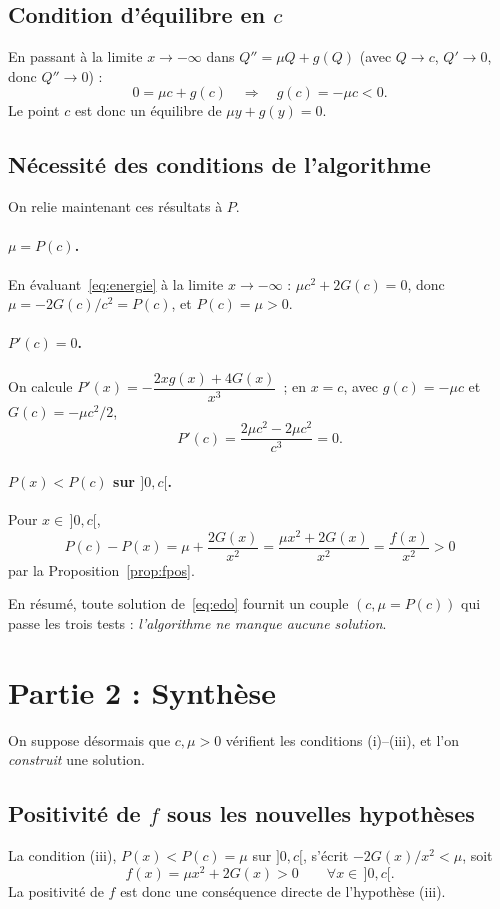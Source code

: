 \documentclass[11pt,a4paper]{article}
\theoremstyle{plain}
\theoremstyle{remark}
\begin{document}
\subsection{Condition d'équilibre en $c$}
En passant à la limite $x\to-\infty$ dans $Q''=\mu Q+g(Q)$ (avec $Q\to c$,
$Q'\to0$, donc $Q''\to0$) :
\[
  0=\mu c+g(c)\quad\Longrightarrow\quad g(c)=-\mu c<0.
\]
Le point $c$ est donc un équilibre de $\mu y+g(y)=0$.

\subsection{Nécessité des conditions de l'algorithme}
On relie maintenant ces résultats à $P$.
\paragraph{$\mu=P(c)$.} En évaluant~\eqref{eq:energie} à la limite $x\to-\infty$ :
$\mu c^2+2G(c)=0$, donc $\mu=-2G(c)/c^2=P(c)$, et $P(c)=\mu>0$.
\paragraph{$P'(c)=0$.} On calcule $P'(x)=-\dfrac{2xg(x)+4G(x)}{x^3}$\ ;
en $x=c$, avec $g(c)=-\mu c$ et $G(c)=-\mu c^2/2$,
\[
  P'(c)=\frac{2\mu c^2-2\mu c^2}{c^3}=0.
\]
\paragraph{$P(x)<P(c)$ sur $]0,c[$.} Pour $x\in\,]0,c[$,
\[
  P(c)-P(x)=\mu+\frac{2G(x)}{x^2}=\frac{\mu x^2+2G(x)}{x^2}=\frac{f(x)}{x^2}>0
\]
par la Proposition~\ref{prop:fpos}. \medskip

\noindent En résumé, toute solution de~\eqref{eq:edo} fournit un couple
$(c,\mu=P(c))$ qui passe les trois tests : \emph{l'algorithme ne manque aucune
solution}.

\section{Partie 2 : Synthèse}
\label{sec:synthese}

On suppose désormais que $c,\mu>0$ vérifient les conditions (i)--(iii), et l'on
\emph{construit} une solution.

\subsection{Positivité de $f$ sous les nouvelles hypothèses}
La condition (iii), $P(x)<P(c)=\mu$ sur $]0,c[$, s'écrit $-2G(x)/x^2<\mu$, soit
\[
  f(x)=\mu x^2+2G(x)>0\qquad\forall x\in\,]0,c[.
\]
La positivité de $f$ est donc une conséquence directe de l'hypothèse (iii).
\end{document}
